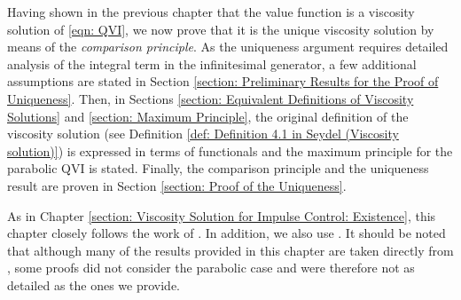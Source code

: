 \label{section: Viscosity Solution for Impulse Control: Uniqueness}
Having shown in the previous chapter that the value function is a viscosity solution of \eqref{eqn: QVI}, we now prove that it is the unique viscosity solution by means of the \textit{comparison principle}. As the uniqueness argument requires detailed analysis of the integral term in the infinitesimal generator, a few additional assumptions are stated in Section \ref{section: Preliminary Results for the Proof of Uniqueness}. Then, in Sections \ref{section: Equivalent Definitions of Viscosity Solutions} and \ref{section: Maximum Principle}, the original definition of the viscosity solution (see Definition \ref{def: Definition 4.1 in Seydel (Viscosity solution)}) is expressed in terms of functionals and the maximum principle for the parabolic QVI is stated. Finally, the comparison principle and the uniqueness result are proven in Section \ref{section: Proof of the Uniqueness}. 

As in Chapter \ref{section: Viscosity Solution for Impulse Control: Existence}, this chapter closely follows the work of \textcite[Section 5]{seydel2010generalexistenceuniquenessviscosity}. In addition, we also use \cite{barles2008second, jakobsen2006maximum}. It should be noted that although many of the results provided in this chapter are taken directly from \cite{seydel2010generalexistenceuniquenessviscosity}, some proofs did not consider the parabolic case and were therefore not as detailed as the ones we provide.

